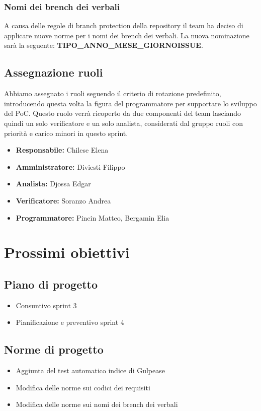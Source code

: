 \subsubsection{Nomi dei brench dei verbali}
A causa delle regole di branch protection della repository il team ha deciso di applicare nuove norme per i nomi dei brench dei verbali.
La nuova nominazione sarà la seguente: \textbf{TIPO\_ANNO\_MESE\_GIORNO\-ISSUE}.

\subsection{Assegnazione ruoli}
Abbiamo assegnato i ruoli seguendo il criterio di rotazione predefinito, introducendo questa volta la figura del programmatore per supportare lo sviluppo del PoC.
Questo ruolo verrà ricoperto da due componenti del team lasciando quindi un solo verificatore e un solo analista, considerati dal gruppo ruoli con priorità e carico minori in questo sprint.
\begin{itemize}
    \item \textbf{Responsabile:} Chilese Elena
    \item \textbf{Amministratore:} Diviesti Filippo
    \item \textbf{Analista:} Djossa Edgar
    \item \textbf{Verificatore:} Soranzo Andrea
    \item \textbf{Programmatore:} Pincin Matteo, Bergamin Elia
\end{itemize}

\section{Prossimi obiettivi}

\subsection{Piano di progetto}
\begin{itemize}
    \item Consuntivo sprint 3
    \item Pianificazione e preventivo sprint 4
\end{itemize}

\subsection{Norme di progetto}
\begin{itemize}
    \item Aggiunta del test automatico indice di Gulpease
    \item Modifica delle norme sui codici dei requisiti
    \item Modifica delle norme sui nomi dei brench dei verbali
\end{itemize}

